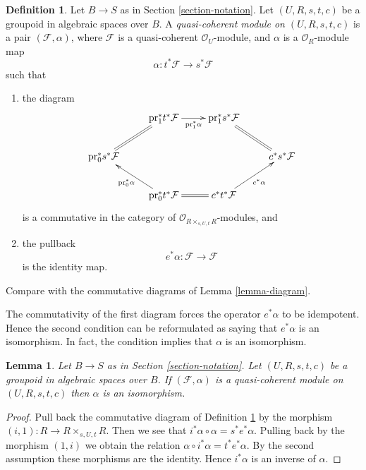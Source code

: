 \documentclass{stacks-project}
\theoremstyle{plain}
\newtheorem{lemma}[subsection]{Lemma}
\theoremstyle{definition}
\newtheorem{definition}[subsection]{Definition}
\theoremstyle{remark}
\numberwithin{equation}{subsection}
\begin{document}
\begin{definition}
\label{definition-groupoid-module}
Let $B \to S$ as in Section \ref{section-notation}.
Let $(U, R, s, t, c)$ be a groupoid in algebraic spaces over $B$.
A {\it quasi-coherent module on $(U, R, s, t, c)$}
is a pair $(\mathcal{F}, \alpha)$, where $\mathcal{F}$ is a quasi-coherent
$\mathcal{O}_U$-module, and $\alpha$ is a $\mathcal{O}_R$-module
map
$$
\alpha : t^*\mathcal{F} \longrightarrow s^*\mathcal{F}
$$
such that
\begin{enumerate}
\item the diagram
$$
\xymatrix{
& \text{pr}_1^*t^*\mathcal{F} \ar[r]_-{\text{pr}_1^*\alpha} &
\text{pr}_1^*s^*\mathcal{F} \ar@{=}[rd] & \\
\text{pr}_0^*s^*\mathcal{F} \ar@{=}[ru] & & & c^*s^*\mathcal{F} \\
& \text{pr}_0^*t^*\mathcal{F} \ar[lu]^{\text{pr}_0^*\alpha} \ar@{=}[r] &
c^*t^*\mathcal{F} \ar[ru]_{c^*\alpha}
}
$$
is a commutative in the category of
$\mathcal{O}_{R \times_{s, U, t} R}$-modules, and
\item the pullback
$$
e^*\alpha : \mathcal{F} \longrightarrow \mathcal{F}
$$
is the identity map.
\end{enumerate}
Compare with the commutative diagrams of Lemma \ref{lemma-diagram}.
\end{definition}

\noindent
The commutativity of the first diagram forces the operator $e^*\alpha$
to be idempotent. Hence the second condition can be reformulated as saying
that $e^*\alpha$ is an isomorphism. In fact, the condition implies that
$\alpha$ is an isomorphism.

\begin{lemma}
\label{lemma-isomorphism}
Let $B \to S$ as in Section \ref{section-notation}.
Let $(U, R, s, t, c)$ be a groupoid in algebraic spaces over $B$.
If $(\mathcal{F}, \alpha)$ is a quasi-coherent module on $(U, R, s, t, c)$
then $\alpha$ is an isomorphism.
\end{lemma}

\begin{proof}
Pull back the commutative diagram of
Definition \ref{definition-groupoid-module}
by the morphism $(i, 1) : R \to R \times_{s, U, t} R$.
Then we see that $i^*\alpha \circ \alpha = s^*e^*\alpha$.
Pulling back by the morphism $(1, i)$ we obtain the relation
$\alpha \circ i^*\alpha = t^*e^*\alpha$. By the second assumption 
these morphisms are the identity. Hence $i^*\alpha$ is an inverse of
$\alpha$.
\end{proof}
\end{document}
